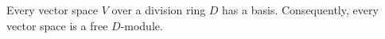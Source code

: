 Every vector space $V$ over a division ring $D$ has a basis. Consequently, every vector space is a free $D$-module.
